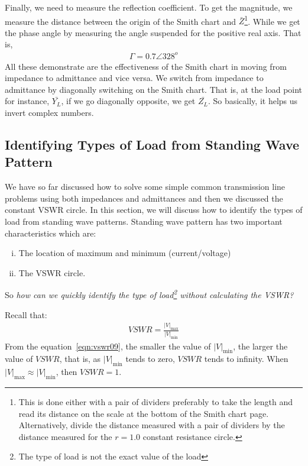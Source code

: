 \begin{exmp}
Finally, we need to measure the reflection coefficient. To get the magnitude, we measure the distance between the origin of the Smith chart and $\bar{Z}$\footnote{
This is done either with a pair of dividers preferably to take the length and read its distance on the scale at the bottom of the Smith chart page. Alternatively, divide the distance measured with a pair of dividers by the distance measured for the $r = 1.0$ constant resistance circle.
}. While we get the phase angle by measuring the angle suspended for the positive real axis. That is,
\begin{align*}
\Gamma = 0.7\angle328^o
\end{align*}
All these demonstrate are the effectiveness of the Smith chart in moving from impedance to admittance and vice versa. We switch from impedance to admittance by diagonally switching on the Smith chart. That is, at the load point for instance, $\bar{Y_{L}}$, if we go diagonally opposite, we get $\bar{Z_{L}}$. So basically, it helps us invert complex numbers. 
\end{exmp}

\subsection{Identifying Types of Load from Standing Wave Pattern}\label{lec:lec9}

We have so far discussed how to solve some simple common transmission line problems using both impedances and admittances and then we discussed the constant VSWR circle. In this section, we will discuss how to identify the types of load from standing wave patterns. Standing wave pattern has two important characteristics which are:
\begin{enumerate}[(i)]
\item The location of maximum and minimum (current/voltage)
\item The VSWR circle.
\end{enumerate}
So \emph{how can we quickly identify the type of load\footnote{The type of load is not the exact value of the load} without calculating the VSWR?}

Recall that:
\begin{align}
VSWR = \frac{|V|_\max}{|V|_\min}
\label{eqn:vswr09}
\end{align}
From the equation~\eqref{eqn:vswr09}, the smaller the value of $|V|_\min$, the larger the value of ${VSWR}$, that is, as $|V|_\min$ tends to zero, ${VSWR}$ tends to infinity. When $|V|_\max{\approx}|V|_\min$, then $VSWR = 1$.

